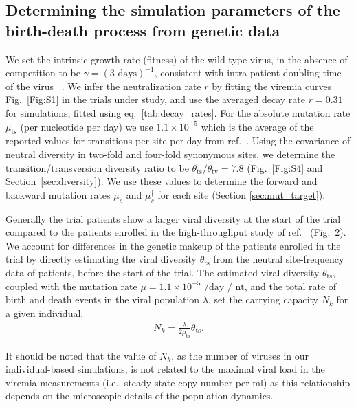 \documentclass[11pt]{article}
\newcommand{\ts}{{\text{ts}}}
\newcommand{\tv}{{\text{tv}}}
\begin{document}
\subsection{Determining the simulation parameters of the birth-death process from genetic data}
We set the intrinsic growth rate (fitness) of the wild-type virus, in the absence of competition to be $\gamma = (3 \text{ days})^{-1}$, consistent with intra-patient doubling time of the virus ~\cite{garciaVirologicalImmunologicalConsequences2001, ioannidisDynamicsHIV1Viral2000, garciaDynamicsViralLoad1999}.  We infer the neutralization rate $r$ by fitting the viremia curves Fig.~\ref{Fig:S1} in the trials under study, and use the averaged decay rate $r=0.31$ for simulations, fitted using eq.~\ref{tab:decay_rates}. For the absolute mutation rate $\mu_{\ts}$ (per nucleotide per day) we use $1.1 \times 10^{-5}$ which is the average of the reported values for transitions per site per day from ref.~\cite{Zanini:2017in}. 
Using the  covariance of neutral diversity in two-fold and four-fold synonymous sites, we determine the  transition/transversion diversity ratio to be $\theta_{\ts}/\theta_{\tv} = 7.8$ (Fig.~\ref{Fig:S4} and Section~\ref{sec:diversity}). We use these values to  determine the forward and backward mutation rates $\mu_s$ and $\mu_s^\dagger$ for each site (Section \ref{sec:mut_target}).

Generally the trial patients show a larger viral diversity at the start of the trial compared to the patients enrolled in the high-throughput study of ref.~\cite{Zanini:2015gg} (Fig.~2).  We account for differences in the genetic makeup of the patients enrolled in the trial by directly estimating the viral diversity $\theta_{\ts}$ from the neutral site-frequency data of patients, before the start of the trial. The estimated viral diversity $\theta_{\ts}$, coupled with the mutation rate $\mu = 1.1 \times 10^{-5} \text{ /day / nt}$, and the total rate of birth and death events in the viral population   $\lambda$, set the carrying capacity $N_k$ for a given individual,
\begin{align}	
	N_k = \frac{\lambda  }{2  \mu_{\ts}}  \theta_{\ts}.
	\label{eq:noise_popsize}
\end{align}

It should be noted that the value of $N_k$, as the number of viruses in our individual-based simulations,  
	is not related to the maximal viral load in the viremia measurements (i.e., steady state copy number per ml) 
	as this relationship depends on the microscopic details of the population dynamics.
\end{document}
